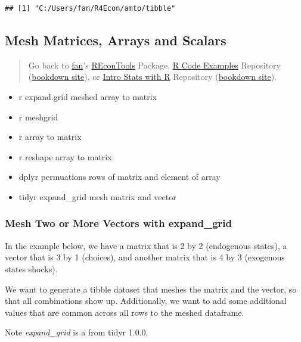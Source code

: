 \documentclass[
]{book}
\providecommand{\tightlist}{%
  \setlength{\itemsep}{0pt}\setlength{\parskip}{0pt}}
\begin{document}
\begin{verbatim}
## [1] "C:/Users/fan/R4Econ/amto/tibble"
\end{verbatim}

\hypertarget{mesh-matrices-arrays-and-scalars}{%
\subsection{Mesh Matrices, Arrays and Scalars}\label{mesh-matrices-arrays-and-scalars}}

\begin{quote}
Go back to \href{http://fanwangecon.github.io/}{fan}'s \href{https://fanwangecon.github.io/REconTools/}{REconTools} Package, \href{https://fanwangecon.github.io/R4Econ/}{R Code Examples} Repository (\href{https://fanwangecon.github.io/R4Econ/bookdown}{bookdown site}), or \href{https://fanwangecon.github.io/Stat4Econ/}{Intro Stats with R} Repository (\href{https://fanwangecon.github.io/Stat4Econ/bookdown}{bookdown site}).
\end{quote}

\begin{itemize}
\tightlist
\item
  r expand.grid meshed array to matrix
\item
  r meshgrid
\item
  r array to matrix
\item
  r reshape array to matrix
\item
  dplyr permuations rows of matrix and element of array
\item
  tidyr expand\_grid mesh matrix and vector
\end{itemize}

\hypertarget{mesh-two-or-more-vectors-with-expand_grid}{%
\subsubsection{Mesh Two or More Vectors with expand\_grid}\label{mesh-two-or-more-vectors-with-expand_grid}}

In the example below, we have a matrix that is 2 by 2 (endogenous states), a vector that is 3 by 1 (choices), and another matrix that is 4 by 3 (exogenous states shocks).

We want to generate a tibble dataset that meshes the matrix and the vector, so that all combinations show up. Additionally, we want to add some additional values that are common across all rows to the meshed dataframe.

Note \emph{expand\_grid} is a from tidyr 1.0.0.
\end{document}

